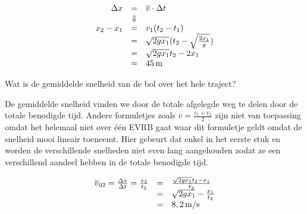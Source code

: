 \documentclass{ximera}
\begin{document}
\begin{exercise}
\begin{question}
\begin{oplossing}
	\[
	\begin{array}{rcl}
	\Delta x&=&\overline{v}\cdot\Delta t\\
	&\Downarrow&\\
	x_2-x_1&=&v_1(t_2-t_1)\\
	&=&\sqrt{2gx_1}(t_2-\sqrt{\frac{2x_1}{g}})\\
	&=&\sqrt{2gx_1}t_2-2x_1\\
	&=&45\rm\,m
	\end{array}
	\]

\end{oplossing}
\end{question}
\begin{question} Wat is de gemiddelde snelheid van de bol over het hele traject? \end{question}

\begin{oplossing}


De gemiddelde snelheid vinden we door de totale afgelegde weg te delen door de totale benodigde tijd. Andere formuletjes zoals $\overline{v}=\frac{v_1+v_2}{2}$ zijn niet van toepassing omdat het helemaal niet over \'e\'en EVRB gaat waar dit formuletje geldt omdat de snelheid mooi lineair toeneemt. Hier gebeurt dat enkel in het eerste stuk en worden de verschillende snelheden niet even lang aangehouden zodat ze een verschillend aandeel hebben in de totale benodigde tijd.

\[
\begin{array}{rcl}
\overline{v}_{02}=\frac{\Delta x}{\Delta t}=\frac{x_2}{t_2}&=&\frac{\sqrt{2gx_1}t_2-x_1}{t_2}\\
&=&\sqrt{2gx_1}-\frac{x_1}{t_2}\\
&=&8,2\rm\,m/s
\end{array}
\]

\end{oplossing}
\end{exercise}

\begin{xmuitweiding}
\end{xmuitweiding}

\end{document}
